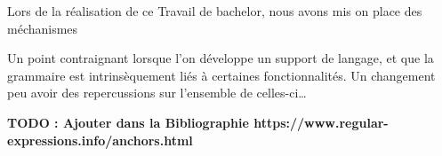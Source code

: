 \documentclass[
    iict, %
    il, %
]{heig-tb}
\begin{document}
Lors de la réalisation de ce Travail de bachelor, nous avons mis on place des méchanismes


Un point contraignant lorsque l'on développe un support de langage, et que la grammaire est intrinsèquement liés à certaines fonctionnalités.
Un changement peu avoir des repercussions sur l'ensemble de celles-ci\dots




\label{glossaire}
\printnoidxglossary
{}

\textbf{TODO : Ajouter dans la Bibliographie https://www.regular-expressions.info/anchors.html}
\printbibliography
{}

\end{document}
